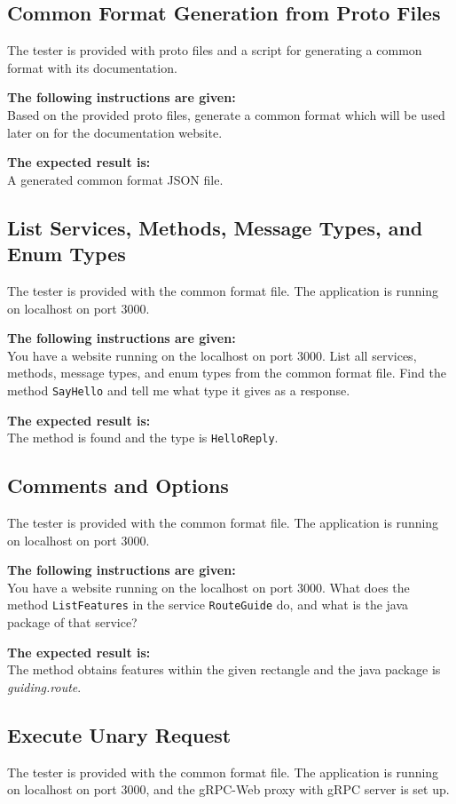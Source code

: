 \subsection{Common Format Generation from Proto Files}
The tester is provided with proto files and a script for generating a common format with its documentation.

\textbf{The following instructions are given:}\\
Based on the provided proto files, generate a common format which will be used later on for the documentation website.

\textbf{The expected result is:}\\
A generated common format JSON file.

\subsection{List Services, Methods, Message Types, and Enum Types}
The tester is provided with the common format file.
The application is running on localhost on port 3000.

\textbf{The following instructions are given:}\\
You have a website running on the localhost on port 3000.
List all services, methods, message types, and enum types from the common format file.
Find the method \texttt{SayHello} and tell me what type it gives as a response.

\textbf{The expected result is:}\\
The method is found and the type is \texttt{HelloReply}.

\subsection{Comments and Options}
The tester is provided with the common format file.
The application is running on localhost on port 3000.

\textbf{The following instructions are given:}\\
You have a website running on the localhost on port 3000.
What does the method \texttt{ListFeatures} in the service \texttt{RouteGuide} do, and what is the java package of that service?

\textbf{The expected result is:}\\
The method obtains features within the given rectangle and the java package is \textit{guiding.route}.

\subsection{Execute Unary Request}
The tester is provided with the common format file.
The application is running on localhost on port 3000, and the gRPC-Web proxy with gRPC server is set up.

